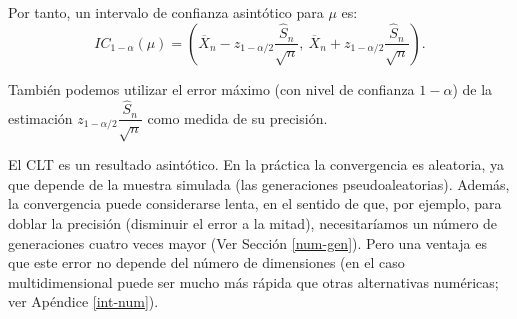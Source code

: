 \documentclass[
]{book}
\theoremstyle{break}
\theoremstyle{nonumberplain}
\begin{document}
Por tanto, un intervalo de confianza asintótico para \(\mu\) es:
\[IC_{1-\alpha }(\mu ) = \left( \overline{X}_{n}
- z_{1-\alpha /2}\dfrac{\widehat{S}_{n}}{\sqrt{n}},\ 
\overline{X}_n+z_{1-\alpha /2}\dfrac{\widehat{S}_{n}}{\sqrt{n}} \right).\]

También podemos utilizar el error máximo (con nivel de confianza \(1-\alpha\)) de la estimación \(z_{1-\alpha /2}\dfrac{\widehat{S}_{n}}{\sqrt{n}}\) como medida de su precisión.

El CLT es un resultado asintótico. En la práctica la convergencia es aleatoria, ya que depende de la muestra simulada (las generaciones pseudoaleatorias).
Además, la convergencia puede considerarse lenta, en el sentido de que, por ejemplo, para doblar la precisión (disminuir el error a la mitad), necesitaríamos un número de generaciones cuatro veces mayor (Ver Sección \ref{num-gen}).
Pero una ventaja es que este error no depende del número de dimensiones (en el caso multidimensional puede ser mucho más rápida que otras alternativas numéricas; ver Apéndice \ref{int-num}).
\end{document}

